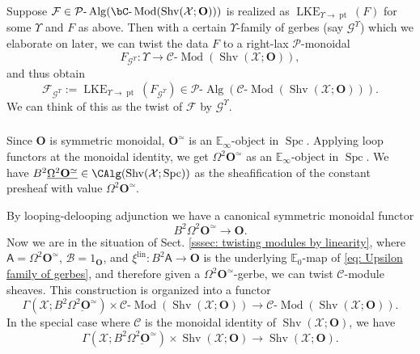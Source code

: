 \documentclass[10pt]{amsart}
\newcommand{\sssec}{\subsubsection}
\theoremstyle{remark}
\newcommand{\ul}{\underline}
\newcommand{\E}{\mathbb{E}}
\newcommand{\cP}{\mathcal{P}}
\newcommand{\on}{\operatorname}
\newcommand{\cB}{\mathcal{B}}
\newcommand{\cC}{\mathcal{C}}
\newcommand{\cF}{\mathcal{F}}
\newcommand{\cG}{\mathcal{G}}
\newcommand{\cX}{\mathcal{X}}
\newcommand{\lMod}{\text{-}\on{Mod}}
\newcommand{\lAlg}{\text{-}\on{Alg}}
\newcommand{\Shv}{\on{Shv}}
\newcommand{\Spc}{\on{Spc}}
\newcommand{\bO}{\mathbf{O}}
\newcommand{\pt}{\on{pt}}
\newcommand{\sfA}{\mathsf{A}}
\begin{document}
\sssec{}\label{sssec: twist by grading outline}
Suppose $\cF\in\cP\lAlg(\bC\lMod(\Shv(\cX;\bO)))$ is realized as $\on{LKE}_{\Upsilon\rightarrow\pt}(F)$ for some $\Upsilon$ and $F$ as above. Then with a certain $\Upsilon$-family of gerbes (say $\cG^\Upsilon$) which we elaborate on later, we can twist the data $F$ to a right-lax $\cP$-monoidal
\begin{equation}\label{eq: twist of grading data}
    F_{\cG^{\Upsilon}}:\Upsilon\rightarrow\cC\lMod(\Shv(\cX;\bO)),
\end{equation}
and thus obtain
\[\cF_{\cG^{\Upsilon}}:=\on{LKE}_{\Upsilon\rightarrow\pt}(F_{\cG^{\Upsilon}})\in\cP\lAlg\left(\cC\lMod\left(\Shv(\cX;\bO)\right)\right).\]
We can think of this as the twist of $\cF$ by $\cG^{\Upsilon}$.

\sssec{}
Since $\bO$ is symmetric monoidal, $\bO^{\simeq}$ is an $\E_{\infty}$-object in $\Spc$. Applying loop functors at the monoidal identity, we get $\Omega^2\bO^{\simeq}$ as an $\E_{\infty}$-object in $\Spc$. We have $B^2\ul{\Omega^2\bO^{\simeq}}\in \CAlg(\Shv(\cX;\Spc))$ as the sheafification of the constant presheaf with value $\Omega^2\bO^{\simeq}$.
\medskip

By looping-delooping adjunction we have a canonical symmetric monoidal functor
\begin{equation}\label{eq: Upsilon family of gerbes}
    B^2\Omega^2\bO^{\simeq}\rightarrow\bO.
\end{equation}
Now we are in the situation of Sect. \ref{sssec: twisting modules by linearity}, where $\sfA=\Omega^2\bO^{\simeq}$, $\cB=1_{\bO}$, and $\xi^{\on{lin}}:B^2\sfA\rightarrow\bO$ is the underlying $\E_0$-map of \eqref{eq: Upsilon family of gerbes}, and therefore given a $\Omega^2\bO^{\simeq}$-gerbe, we can twist $\cC$-module sheaves. This construction is organized into a functor
\begin{equation}\label{eq: twisting module action functor}
    \Gamma(\cX;B^2\ul{\Omega^2\bO^{\simeq}})\times \cC\lMod(\Shv(\cX;\bO))\rightarrow\cC\lMod(\Shv(\cX;\bO)).
\end{equation}
In the special case where $\cC$ is the monoidal identity of $\Shv(\cX;\bO)$, we have
\begin{equation}\label{eq: twisting action functor}
\Gamma(\cX;B^2\ul{\Omega^2\bO^{\simeq}})\times \Shv(\cX;\bO)\rightarrow\Shv(\cX;\bO).
\end{equation}
\end{document}
